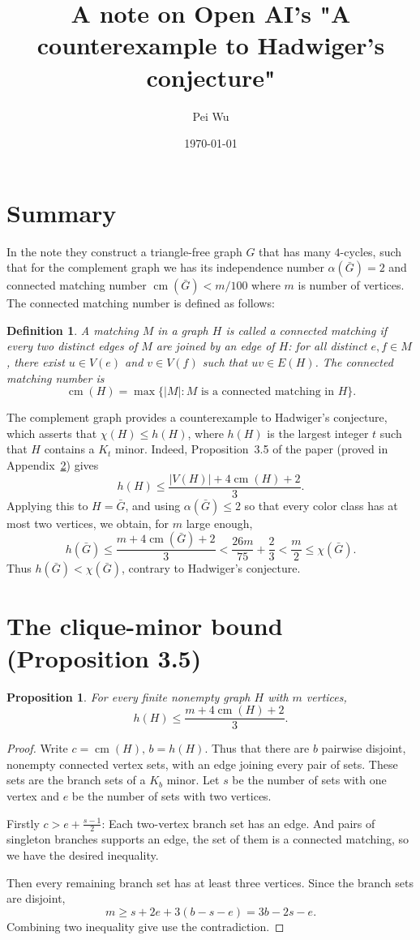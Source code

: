\documentclass[11pt]{article}
\title{A note on Open AI's "A counterexample to Hadwiger’s conjecture"}
\author{Pei Wu}
\date{\today}
\newtheorem{proposition}{Proposition}
\newtheorem{defn}[theorem]{Definition}
\newcommand{\cm}{\operatorname{cm}}
\begin{document}
	
	\maketitle
	
	\section{Summary}
	In the note they construct a triangle-free graph $G$ that has many $4$-cycles, such that for the complement graph we has its independence number $\alpha(\bar G)=2$ and  connected matching number $\cm (\bar G)< m/100$ where $m$ is number of vertices. The connected matching number is defined as follows:
	
	\begin{defn}
		A matching $M$ in a graph $H$ is called a \emph{connected matching} if every two distinct edges of $M$ are joined by an edge of $H$: for all distinct $e,f\in M$, there exist $u\in V(e)$ and $v\in V(f)$ such that $uv\in E(H)$. The \emph{connected matching number} is
	\[
	\cm(H)=\max\bigl\{|M|: M\text{ is a connected matching in }H\bigr\}.
	\]
	\end{defn}
	
	The complement graph provides a counterexample to Hadwiger's conjecture, which asserts that $\chi(H)\le h(H)$, where $h(H)$ is the largest integer $t$ such that $H$ contains a $K_t$ minor. Indeed, Proposition~3.5 of the paper (proved in Appendix~\ref{app:minor-bound}) gives
	\[
	h(H)\le \frac{|V(H)|+4\cm(H)+2}{3}.
	\]
	Applying this to $H=\bar G$, and using $\alpha(\bar G)\le 2$ so that every color class has at most two vertices, we obtain, for $m$ large enough,
	\[
	h(\bar G)
	\le \frac{m+4\cm(\bar G)+2}{3}
	< \frac{26m}{75}+\frac{2}{3}
	< \frac{m}{2}
	\le \chi(\bar G).
	\]
	Thus $h(\bar G)<\chi(\bar G)$, contrary to Hadwiger's conjecture.
\appendix
\section{The clique-minor bound (Proposition 3.5)}
\label{app:minor-bound}

\begin{proposition}
For every finite nonempty graph $H$ with $m$ vertices,
\[
h(H)\le \frac{m+4\cm(H)+2}{3}.
\]
\end{proposition}

\begin{proof}
Write $c=\cm(H),\,b=h(H)$. Thus that there are $b$ pairwise disjoint, nonempty connected vertex sets, with an edge joining every pair of sets.
These sets are the branch sets of a $K_b$ minor. Let $s$ be the number of sets with one vertex and $e$ be the number of sets with two vertices.

Firstly $c>e+\frac{s-1}{2}$:
Each two-vertex branch set has an edge. And pairs of singleton branches supports an edge, the set of them is a connected matching, so we have the desired inequality. 

Then every remaining branch set has at least three vertices. Since the branch sets are disjoint,
\[
m\ge s+2e+3(b-s-e)=3b-2s-e.
\]
Combining two inequality give use the contradiction.
\end{proof}
\end{document}
